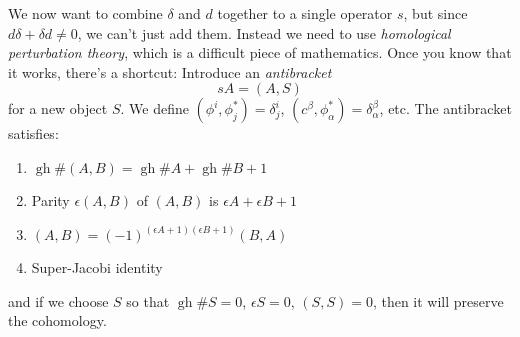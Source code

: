 We now want to combine $\delta$ and $d$ together to a single operator $s$, but since $d \delta + \delta d \ne 0$, we can't just add them.
Instead we need to use \emph{homological perturbation theory}, which is a difficult piece of mathematics.
Once you know that it works, there's a shortcut:
Introduce an \emph{antibracket}
\[
sA = (A,S) 
\]
for a new object $S$.
We define $(\phi^i, \phi_j^*) = \delta^i_j$, $(c^\beta, \phi_\alpha^*) = \delta_\alpha^\beta$, etc.
The antibracket satisfies:
\begin{enumerate}
    \item $\operatorname{gh}\#(A,B) = \operatorname{gh}\# A + \operatorname{gh}\# B + 1$
    \item Parity $\epsilon(A,B)$ of $(A,B)$ is $\epsilon A + \epsilon B + 1$
    \item $(A,B) = (-1)^{(\epsilon A +1)(\epsilon B +1)}(B,A)$
    \item Super-Jacobi identity
\end{enumerate}
and if we choose $S$ so that $\operatorname{gh} \# S = 0$, $\epsilon S = 0$, $(S,S) =0$, then it will preserve the cohomology.